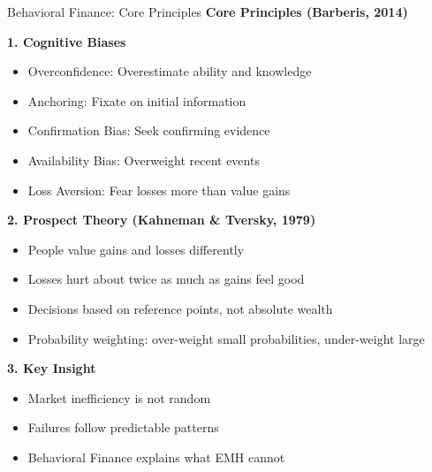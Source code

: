 \documentclass[aspectratio=169,10pt]{beamer}
\renewcommand{\small}{\fontsize{7pt}{8.5pt}\selectfont}
\renewcommand{\large}{\fontsize{9pt}{11pt}\selectfont}
\newcommand{\question}[1]{{\large\bfseries\color{crimson}#1}}
\begin{document}
	\begin{frame}{Behavioral Finance: Core Principles}
		\question{Core Principles (Barberis, 2014)}
		\small
		
		\textbf{1. Cognitive Biases}
		\begin{itemize}
			\item Overconfidence: Overestimate ability and knowledge
			\item Anchoring: Fixate on initial information
			\item Confirmation Bias: Seek confirming evidence
			\item Availability Bias: Overweight recent events
			\item Loss Aversion: Fear losses more than value gains
		\end{itemize}
		
		\vspace{0.1cm}
		\textbf{2. Prospect Theory (Kahneman \& Tversky, 1979)}
		\begin{itemize}
			\item People value gains and losses differently
			\item Losses hurt about twice as much as gains feel good
			\item Decisions based on reference points, not absolute wealth
			\item Probability weighting: over-weight small probabilities, under-weight large
		\end{itemize}
		
		\vspace{0.1cm}
		\textbf{3. Key Insight}
		\begin{itemize}
			\item Market inefficiency is not random
			\item Failures follow predictable patterns
			\item Behavioral Finance explains what EMH cannot
		\end{itemize}
	\end{frame}
	
	
\end{document}
